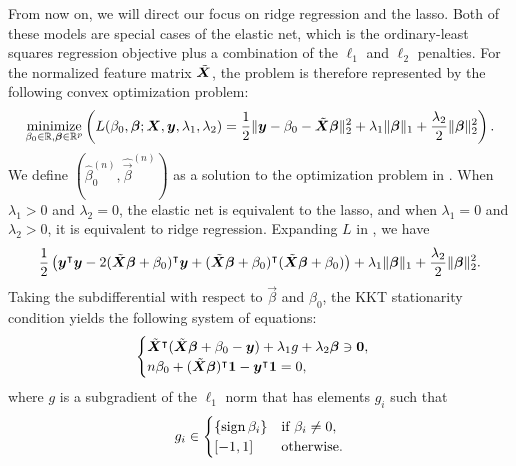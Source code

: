 From now on, we will direct our focus on ridge regression and the lasso. Both of these models are special cases of the elastic net, which is the ordinary-least squares regression objective plus a combination of the \(\ell_1\) and \(\ell_2\) penalties. For the normalized feature matrix \(\tilde{\boldsymbol{X}}\), the problem is therefore represented by the following convex optimization problem:
\begin{equation}
  \label{eq:elastic-net}
  \operatorname*{minimize}_{\beta_0 \in \mathbb{R},\boldsymbol{\beta} \in \mathbb{R}^p}\left( L(\beta_0, \boldsymbol{\beta};\boldsymbol{X},\boldsymbol{y},\lambda_1,\lambda_2)=\frac{1}{2} \lVert \boldsymbol y - \beta_0 - \tilde{\boldsymbol{X}}\boldsymbol{\beta} \rVert^2_2  + \lambda_1 \lVert \boldsymbol\beta \rVert_1 + \frac{\lambda_2}{2}\lVert \boldsymbol \beta \rVert_2^2\right).
\end{equation}
We define \((\hat{\beta}_0^{(n)}, \hat{\vec{\beta}}^{(n)})\) as a solution to the optimization problem in .
When \(\lambda_1 > 0\) and \(\lambda_2 = 0\), the elastic net is equivalent to the lasso, and when \(\lambda_1 = 0\) and \(\lambda_2 > 0\), it is equivalent to ridge regression. Expanding \(L\) in , we have
\[
  \begin{aligned}
    \frac{1}{2}\left( \boldsymbol y^\intercal \boldsymbol y - 2(\tilde{\boldsymbol{X}}\boldsymbol{\beta} + \beta_0)^\intercal\boldsymbol{y} + (\tilde{\boldsymbol{X}}\boldsymbol{\beta} + \beta_0)^\intercal(\tilde{\boldsymbol{X}}\boldsymbol{\beta} + \beta_0)\right) + \lambda_1 \lVert \boldsymbol\beta \rVert_1 + \frac{\lambda_2}{2}\lVert \boldsymbol \beta \rVert_2^2.
  \end{aligned}
\]
Taking the subdifferential with respect to \(\vec{\beta}\) and \(\beta_0\), the KKT stationarity condition yields the following system of equations:
\begin{equation}
  \label{eq:kkt-elasticnet}
  \begin{cases}
    \tilde{\boldsymbol{X}}^\intercal(\tilde{\boldsymbol{X}}\boldsymbol{\beta} + \beta_0 - \boldsymbol{y}) + \lambda_1 g + \lambda_2 \boldsymbol\beta \ni \boldsymbol{0}, \\
    n \beta_0 + (\tilde{\boldsymbol{X}}\boldsymbol{\beta})^\intercal \boldsymbol{1} - \boldsymbol{y}^\intercal \boldsymbol{1} = 0,
  \end{cases}
\end{equation}
where \(g\) is a subgradient of the \(\ell_1\) norm that has elements \(g_i\) such that
\[
  g_i \in
  \begin{cases}
    \{\operatorname{sign}{\beta_i}\} & \text{if } \beta_i \neq 0, \\
    [-1, 1]            & \text{otherwise}.
  \end{cases}
\]

